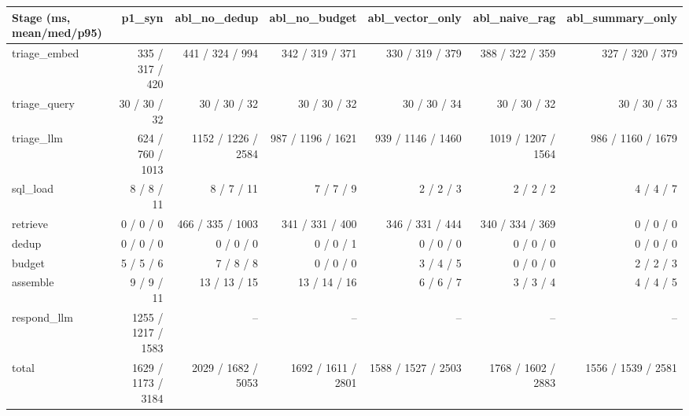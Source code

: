\begin{tabular}{lrrrrrr}
\toprule
Stage (ms, mean/med/p95) & p1\_syn & abl\_no\_dedup & abl\_no\_budget & abl\_vector\_only & abl\_naive\_rag & abl\_summary\_only \\
\midrule
triage\_embed & 335 / 317 / 420 & 441 / 324 / 994 & 342 / 319 / 371 & 330 / 319 / 379 & 388 / 322 / 359 & 327 / 320 / 379 \\
triage\_query & 30 / 30 / 32 & 30 / 30 / 32 & 30 / 30 / 32 & 30 / 30 / 34 & 30 / 30 / 32 & 30 / 30 / 33 \\
triage\_llm & 624 / 760 / 1013 & 1152 / 1226 / 2584 & 987 / 1196 / 1621 & 939 / 1146 / 1460 & 1019 / 1207 / 1564 & 986 / 1160 / 1679 \\
sql\_load & 8 / 8 / 11 & 8 / 7 / 11 & 7 / 7 / 9 & 2 / 2 / 3 & 2 / 2 / 2 & 4 / 4 / 7 \\
retrieve & 0 / 0 / 0 & 466 / 335 / 1003 & 341 / 331 / 400 & 346 / 331 / 444 & 340 / 334 / 369 & 0 / 0 / 0 \\
dedup & 0 / 0 / 0 & 0 / 0 / 0 & 0 / 0 / 1 & 0 / 0 / 0 & 0 / 0 / 0 & 0 / 0 / 0 \\
budget & 5 / 5 / 6 & 7 / 8 / 8 & 0 / 0 / 0 & 3 / 4 / 5 & 0 / 0 / 0 & 2 / 2 / 3 \\
assemble & 9 / 9 / 11 & 13 / 13 / 15 & 13 / 14 / 16 & 6 / 6 / 7 & 3 / 3 / 4 & 4 / 4 / 5 \\
respond\_llm & 1255 / 1217 / 1583 & -- & -- & -- & -- & -- \\
total & 1629 / 1173 / 3184 & 2029 / 1682 / 5053 & 1692 / 1611 / 2801 & 1588 / 1527 / 2503 & 1768 / 1602 / 2883 & 1556 / 1539 / 2581 \\
\bottomrule
\end{tabular}
